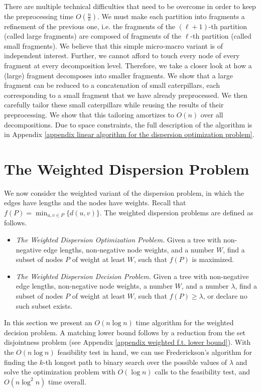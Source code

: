 \documentclass[a4paper,UKenglish]{lipics-v2016}
\theoremstyle{plain}
\begin{document}
There are multiple technical difficulties that need to be overcome in order to keep the preprocessing time $O(\frac{n}{b})$.
We must make each partition into fragments a refinement of the previous one, i.e. the fragments of the $(\ell+1)$-th partition (called large fragments)
are composed of fragments of the $\ell$-th partition (called small fragments). We believe that this simple micro-macro variant is of independent interest. 
Further, we cannot afford to touch every node of every fragment at every decomposition level. Therefore, we take a closer look at how a (large) fragment decomposes into smaller fragments. 
We show that a large fragment can be reduced to a concatenation of small caterpillars, each corresponding to a small fragment that we have already preprocessed. We then carefully tailor these small caterpillars while reusing the results of their preprocessing. We show that this tailoring amortizes to $O(n)$ over all decompositions. Due to space constraints, the full description of the algorithm is in Appendix \ref{appendix linear algorithm for the dispersion optimization problem}.

\section{The Weighted Dispersion Problem}\label{section:weighted}
We now consider the weighted variant of the dispersion problem, in which the edges have lengths and the nodes have weights. Recall that $f(P)=\min_{u,v\in P} \{d(u,v)\}$. The weighted dispersion problems are defined as follows.
\begin{itemize} 
\item {\em The Weighted Dispersion Optimization Problem.} Given a tree with non-negative edge lengths, non-negative node weights, and a number $W$, find a subset of nodes $P$ of weight at least $W$, such that  $f(P)$ is maximized. 

\item {\em The Weighted Dispersion Decision Problem.} Given a tree with non-negative edge lengths, non-negative node weights, a number $W$, and a number $\lambda$, find a subset of nodes  $P$ of weight at least $W$, such that $f(P)\geq\lambda$, or declare no such subset exists. 
\end{itemize}


In this section we present an $O(n\log n)$ time algorithm for the weighted decision problem. A matching lower bound follows by a reduction from the set disjointness problem (see Appendix \ref{appendix weighted f.t. lower bound}).
With the $O(n\log n)$ feasibility test in hand, we can use Frederickson's algorithm for finding the $k$-th longest path \cite{Frederickson1983} to binary search over the possible values of $\lambda$ and solve the optimization problem with $O(\log n)$ calls to the feasibility test, and $O(n\log^{2}n)$ time overall.
\end{document}
